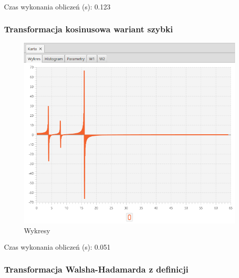 \documentclass[12pt]{article}
\begin{document}
{{{                Czas wykonania obliczeń (s): 0.123
            }
            \newpage

            \subsubsection{Transformacja kosinusowa wariant szybki} {

                \begin{figure}[H]
                    \centering
                    \includegraphics[width=\textwidth]{img/result/s2/05/data_draw_5_sinus_sampling_trans_s2_data_205820.png}
                    \caption{Wykresy}
                \end{figure}

                Czas wykonania obliczeń (s): 0.051
            }
            \newpage

            \subsubsection{Transformacja Walsha-Hadamarda z definicji} {

}}}
\end{document}
